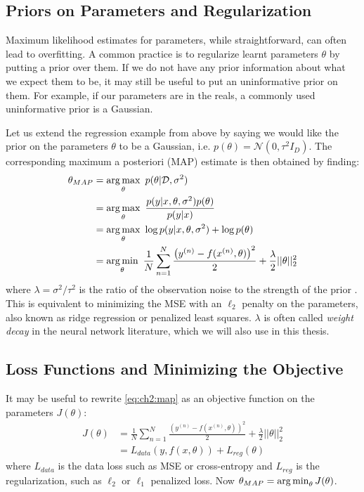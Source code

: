 \subsection{Priors on Parameters and Regularization}
  Maximum likelihood estimates for parameters, while straightforward, can often
  lead to overfitting. A common practice is to regularize learnt parameters
  $\theta$ by putting a prior over them. If we do not have any prior information
  about what we expect them to be, it may still be useful to put an
  uninformative prior on them. For example, if our parameters are in the
  reals, a commonly used uninformative prior is a Gaussian.

  Let us extend the regression example from above by saying we would like the
  prior on the parameters $\theta$ to be a Gaussian, i.e. 
  $p(\theta) = \mathcal{N}(0, \tau^2I_D)$. The corresponding maximum a posteriori
  (MAP) estimate is then obtained by finding:
  \begin{align}\label{eq:ch2:map}
    \theta_{MAP} &= \operatorname*{arg\,max}_\theta\ p(\theta | \mathcal{D}, \sigma^2) \\
                 &= \operatorname*{arg\,max}_\theta\ \frac{p(y| x, \theta, \sigma^2) p(\theta)}{p(y|x)} \\
                 &= \operatorname*{arg\,max}_\theta\ \log p(y|x, \theta, \sigma^2) + \log p(\theta) \\
                 &= \operatorname*{arg\,min}_{\theta}\ \frac{1}{N}\sum_{n=1}^{N} \frac{\left(y^{(n)} - f(x^{(n)}, \theta)\right)^2}{2} + 
      \frac{\lambda}{2} ||\theta||_2^2
  \end{align}
  where $\lambda = \sigma^2/\tau^2$ is the ratio of the observation noise to the
  strength of the prior \cite[Chapter~7]{murphy_machine_2012}. This is
  equivalent to minimizing the MSE with an $\ell_2$ penalty on the parameters,
  also known as ridge regression or penalized least squares.
  $\lambda$ is often called \emph{weight decay} in the neural network
  literature, which we will also use in this thesis.
  
\subsection{Loss Functions and Minimizing the Objective}
  It may be useful to rewrite \eqref{eq:ch2:map} as an objective function on the
  parameters $J(\theta)$:
  \begin{align}
    J(\theta) &=\frac{1}{N}\sum_{n=1}^{N} \frac{\left(y^{(n)} - f(x^{(n)}, \theta)\right)^2}{2} + 
                  \frac{\lambda}{2} ||\theta||_2^2 \label{eq:ch2:regression_ob} \\
              &= L_{data}(y, f(x, \theta)) + L_{reg}(\theta) \label{eq:ch2:objective}
  \end{align}
  where $L_{data}$ is the data loss such as MSE or cross-entropy and
  $L_{reg}$ is the regularization, such as $\ell_2$ or $\ell_1$ penalized loss. 
  Now $\theta_{MAP} = \operatorname*{arg\,min}_\theta J(\theta)$. 

